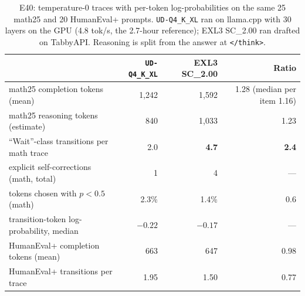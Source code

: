\documentclass[11pt]{article}
\newcommand{\q}[1]{\texttt{#1}}
\begin{document}
\begin{table}[htbp]
\caption{E49 (H38c) and E50 (H38d): same-config re-runs and paired traces on
the first 100 GSM8K-500 items, daily-driver config with and without the
drafter, temperature~0. $\varepsilon=-\ln(\text{identity})/280$, the suite's
median undrafted length. Controls (i) and (ii) were pre-registered before
either ran, (iii) after (i) had been read and before it ran, and H38d with
its speed addendum on 2026-09-10 before either ran. ``Mixed'' is the
campaign's library set (the system cuBLASLt and NVRTC 12.1 beside torch's
bundled 12.8 libraries), ``clean'' the fully bundled set with
\q{LD\_LIBRARY\_PATH} unset, the loaded libraries recorded per run
(\q{EFF-h38d\_*\_cuda\_libs.txt}, no system library). The run-to-run
spread of one configuration at $n=100$ is about 8\% (6.39 against 5.87\,s
drafted), which is why the speed addendum's $\pm5\%$ band is not a usable
test. 52\,min of GPU for E49; E50 is the labels
\q{EFF-h38d\_nodraft\_clean1/2} and \q{EFF-h38d\_mtp\_clean1}.}
\label{tab:h38c}
\end{table}

\begin{table}[htbp]
\centering
\scriptsize
\begin{tabular}{lrrr}
\toprule
 & \q{UD-Q4\_K\_XL} & EXL3 SC\_2.00 & Ratio \\
\midrule
math25 completion tokens (mean) & 1,242 & 1,592 & 1.28 (median per item 1.16) \\
math25 reasoning tokens (estimate) & 840 & 1,033 & 1.23 \\
``Wait''-class transitions per math trace & 2.0 & \textbf{4.7} & \textbf{2.4} \\
explicit self-corrections (math, total) & 1 & 4 & --- \\
tokens chosen with $p<0.5$ (math) & 2.3\% & 1.4\% & 0.6 \\
transition-token log-probability, median & $-0.22$ & $-0.17$ & --- \\
HumanEval+ completion tokens (mean) & 663 & 647 & 0.98 \\
HumanEval+ transitions per trace & 1.95 & 1.50 & 0.77 \\
\bottomrule
\end{tabular}
\caption{E40: temperature-0 traces with per-token log-probabilities on the
same 25 math25 and 20 HumanEval+ prompts. \q{UD-Q4\_K\_XL} ran on llama.cpp
with 30 layers on the GPU (4.8 tok/s, the 2.7-hour reference); EXL3 SC\_2.00
ran drafted on TabbyAPI. Reasoning is split from the answer at \q{</think>}.}
\label{tab:traces}
\end{table}
\end{document}
